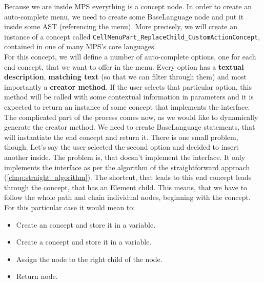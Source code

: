 Because we are inside MPS everything is a concept node.
In order to create an auto-complete menu, we need to create some BaseLanguage node and put it inside some AST (referencing the menu).
More precisely, we will create an instance of a concept called \texttt{CellMenuPart{\_}ReplaceChild{\_}CustomActionConcept}, contained in one of many MPS's core languages.
\\

For this concept, we will define a number of auto-complete options, one for each end concept, that we want to offer in the menu.
Every option has a \textbf{textual description}, \textbf{matching text} (so that we can filter through them) and most importantly a \textbf{creator method}.
If the user selects that particular option, this method will be called with some contextual information in parameters and it is expected to return an instance of some concept that implements the  interface.
\\

The complicated part of the process comes now, as we would like to dynamically generate the creator method.
We need to create BaseLanguage statements, that will instantiate the end concept and return it.
There is one small problem, though.
Let's say the user selected the second option and decided to insert another  inside.
The problem is, that  doesn't implement the  interface.
It only implements the  interface as per the algorithm of the straightforward approach (\ref{chap:straight_algorithm}).
The shortcut, that leads to this end concept leads through the  concept, that has an Element child.
This means, that we have to follow the whole path and chain individual nodes, beginning with the  concept.
For this particular case it would mean to:

\begin{itemize}
	\item Create an  concept and store it in a variable.

	\item Create a  concept and store it in a variable.

	\item Assign the  node to the right child of the  node.

	\item Return  node.
\end{itemize}

